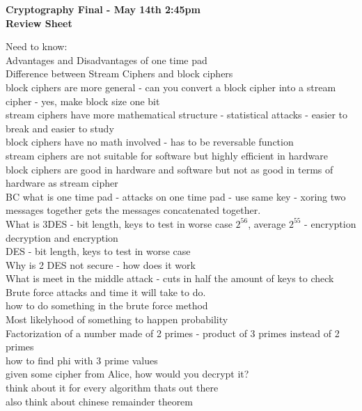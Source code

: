 \documentclass[12pt]{amsart}
\begin{document}
\thispagestyle{empty}

\begin{center}
{\bf Cryptography Final - May 14th 2:45pm}\\
{\bf Review Sheet}\\
\end{center}
Need to know:\\
Advantages and Disadvantages of one time pad\\
Difference between Stream Ciphers and block ciphers\\
	block ciphers are more general - can you convert a block cipher into a stream cipher - yes, make block size one bit\\
	stream ciphers have more mathematical structure - statistical attacks - easier to break and easier to study\\
	block ciphers have no math involved - has to be reversable function\\
	stream ciphers are not suitable for software but highly efficient in hardware\\
	block ciphers are good in hardware and software but not as good in terms of hardware as stream cipher\\
	BC what is one time pad - attacks on one time pad - use same key - xoring two messages together gets the messages concatenated together.\\
	What is 3DES - bit length, keys to test in worse case $2^{56}$, average $2^{55}$ - encryption decryption and encryption\\
	DES - bit length, keys to test in worse case \\
	Why is 2 DES not secure - how does it work\\
	What is meet in the middle attack - cuts in half the amount of keys to check\\
Brute force attacks and time it will take to do.\\
	how to do something in the brute force method\\
Most likelyhood of something to happen probability\\
Factorization of a number made of 2 primes - product of 3 primes instead of 2 primes\\
	how to find phi with 3 prime values\\
	given some cipher from Alice, how would you decrypt it?\\
	think about it for every algorithm thats out there\\
	also think about chinese remainder theorem\\
\end{document}
